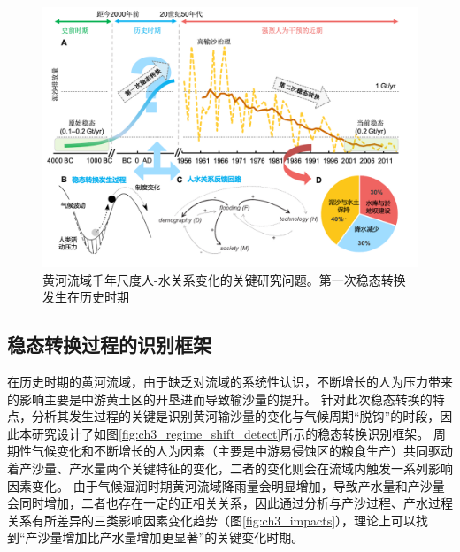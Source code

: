 \begin{figure}[H] %
    \centering
    \includegraphics[width=\textwidth]{img/ch3/ch3_why_regime_shift.png}
    \caption[黄河流域千年尺度人-水关系变化的关键研究问题]{黄河流域千年尺度人-水关系变化的关键研究问题。第一次稳态转换发生在历史时期}
    \label{fig:ch3_why_regime_shift}
\end{figure}


\subsection{稳态转换过程的识别框架}

在历史时期的黄河流域，由于缺乏对流域的系统性认识，不断增长的人为压力带来的影响主要是中游黄土区的开垦进而导致输沙量的提升\cite{wu2020a}。
针对此次稳态转换的特点，分析其发生过程的关键是识别黄河输沙量的变化与气候周期“脱钩”的时段，因此本研究设计了如图\ref{fig:ch3_regime_shift_detect}所示的稳态转换识别框架。
周期性气候变化和不断增长的人为因素（主要是中游易侵蚀区的粮食生产）共同驱动着产沙量、产水量两个关键特征的变化，二者的变化则会在流域内触发一系列影响因素变化。
由于气候湿润时期黄河流域降雨量会明显增加，导致产水量和产沙量会同时增加，二者也存在一定的正相关关系，因此通过分析与产沙过程、产水过程关系有所差异的三类影响因素变化趋势（图\ref{fig:ch3_impacts}），理论上可以找到“产沙量增加比产水量增加更显著”的关键变化时期。


